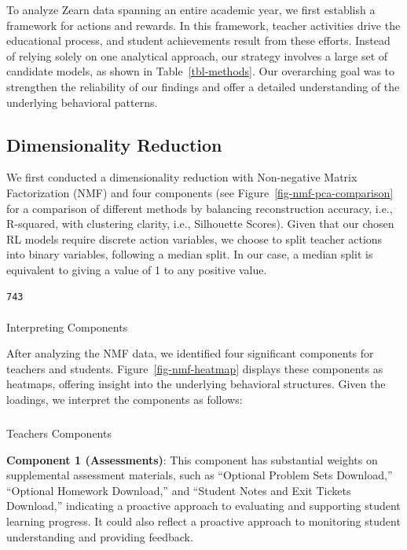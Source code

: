 \documentclass[
  number,
  preprint,
  3p,
  onecolumn]{elsarticle}
\makeatletter
\let\oldparagraph\paragraph
\renewcommand{\paragraph}{
    \@ifstar
      \xxxParagraphStar
      \xxxParagraphNoStar
  }
\newcommand{\xxxParagraphStar}[1]{\oldparagraph*{#1}\mbox{}}
\newcommand{\xxxParagraphNoStar}[1]{\oldparagraph{#1}\mbox{}}
\let\oldsubparagraph\subparagraph
\renewcommand{\subparagraph}{
    \@ifstar
      \xxxSubParagraphStar
      \xxxSubParagraphNoStar
  }
\newcommand{\xxxSubParagraphStar}[1]{\oldsubparagraph*{#1}\mbox{}}
\newcommand{\xxxSubParagraphNoStar}[1]{\oldsubparagraph{#1}\mbox{}}
\makeatother
\begin{document}
To analyze Zearn data spanning an entire academic year, we first
establish a framework for actions and rewards. In this framework,
teacher activities drive the educational process, and student
achievements result from these efforts. Instead of relying solely on one
analytical approach, our strategy involves a large set of candidate
models, as shown in Table~\ref{tbl-methods}. Our overarching goal was to
strengthen the reliability of our findings and offer a detailed
understanding of the underlying behavioral patterns.

\subsection{Dimensionality Reduction}\label{dimensionality-reduction}

We first conducted a dimensionality reduction with Non-negative Matrix
Factorization (NMF) and four components (see
Figure~\ref{fig-nmf-pca-comparison} for a comparison of different
methods by balancing reconstruction accuracy, i.e., R-squared, with
clustering clarity, i.e., Silhouette Scores). Given that our chosen RL
models require discrete action variables, we choose to split teacher
actions into binary variables, following a median split. In our case, a
median split is equivalent to giving a value of 1 to any positive value.

\begin{verbatim}
743
\end{verbatim}

\paragraph{Interpreting Components}\label{interpreting-components}

After analyzing the NMF data, we identified four significant components
for teachers and students. Figure~\ref{fig-nmf-heatmap} displays these
components as heatmaps, offering insight into the underlying behavioral
structures. Given the loadings, we interpret the components as follows:

\subparagraph{Teachers Components}\label{teachers-components}

\textbf{Component 1 (Assessments)}: This component has substantial
weights on supplemental assessment materials, such as ``Optional Problem
Sets Download,'' ``Optional Homework Download,'' and ``Student Notes and
Exit Tickets Download,'' indicating a proactive approach to evaluating
and supporting student learning progress. It could also reflect a
proactive approach to monitoring student understanding and providing
feedback.
\end{document}
